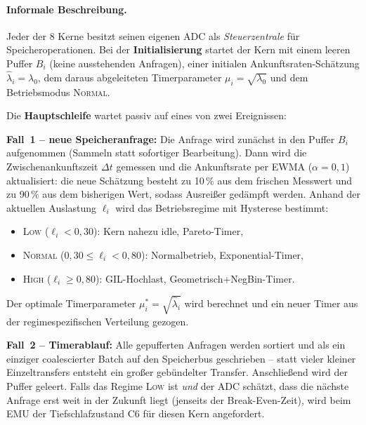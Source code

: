 ﻿\documentclass[a4paper,12pt]{scrreprt}
\theoremstyle{definition}
\begin{document}
	\paragraph{Informale Beschreibung.}
	Jeder der 8 Kerne besitzt seinen eigenen ADC als \emph{Steuerzentrale} für Speicheroperationen.
	Bei der \textbf{Initialisierung} startet der Kern mit einem leeren Puffer $B_i$ (keine ausstehenden Anfragen),
	einer initialen Ankunftsraten-Schätzung $\hat\lambda_i = \lambda_0$, dem daraus abgeleiteten Timerparameter
	$\mu_i = \sqrt{\lambda_0}$ und dem Betriebsmodus \textsc{Normal}.

	Die \textbf{Hauptschleife} wartet passiv auf eines von zwei Ereignissen:

	\textbf{Fall~1 -- neue Speicheranfrage:}
	Die Anfrage wird zunächst in den Puffer $B_i$ aufgenommen (Sammeln statt sofortiger Bearbeitung).
	Dann wird die Zwischenankunftszeit $\Delta t$ gemessen und die Ankunftsrate per EWMA ($\alpha = 0{,}1$)
	aktualisiert: die neue Schätzung besteht zu 10\,\% aus dem frischen Messwert und zu 90\,\% aus dem
	bisherigen Wert, sodass Ausreißer gedämpft werden.
	Anhand der aktuellen Auslastung $\ell_i$ wird das Betriebsregime mit Hysterese bestimmt:
	\begin{itemize}
		\item \textsc{Low} ($\ell_i < 0{,}30$): Kern nahezu idle, Pareto-Timer,
		\item \textsc{Normal} ($0{,}30 \le \ell_i < 0{,}80$): Normalbetrieb, Exponential-Timer,
		\item \textsc{High} ($\ell_i \ge 0{,}80$): GIL-Hochlast, Geometrisch+NegBin-Timer.
	\end{itemize}
	Der optimale Timerparameter $\mu_i^* = \sqrt{\hat\lambda_i}$ wird berechnet und ein neuer Timer
	aus der regimespezifischen Verteilung gezogen.

	\textbf{Fall~2 -- Timerablauf:}
	Alle gepufferten Anfragen werden sortiert und als ein einziger coalescierter Batch auf den Speicherbus
	geschrieben -- statt vieler kleiner Einzeltransfers entsteht ein großer gebündelter Transfer.
	Anschließend wird der Puffer geleert. Falls das Regime \textsc{Low} ist \emph{und} der ADC schätzt,
	dass die nächste Anfrage erst weit in der Zukunft liegt (jenseits der Break-Even-Zeit), wird
	beim EMU der Tiefschlafzustand C6 für diesen Kern angefordert.
\end{document}
